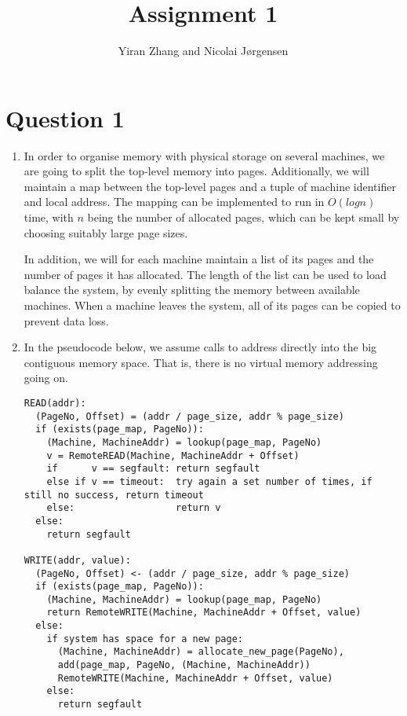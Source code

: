 \documentclass[11pt]{article}
\title          {Assignment 1}
\author         {Yiran Zhang and Nicolai Jørgensen}
\begin{document}
\maketitle
\newpage

\section{Question 1}

\begin{enumerate}

  \item
    In order to organise memory with physical storage on several machines, we are
    going to split the top-level memory into pages. Additionally, we will maintain a
    map between the top-level pages and a tuple of machine identifier and local
    address. The mapping can be implemented to run in $O(log n)$ time, with $n$ being the
    number of allocated pages, which can be kept small by choosing suitably large
    page sizes.

    In addition, we will for each machine maintain a list of its pages and the
    number of pages it has allocated. The length of the list can be used to load
    balance the system, by evenly splitting the memory between available machines.
    When a machine leaves the system, all of its pages can be copied to prevent data
    loss.

  \item
    In the pseudocode below, we assume calls to address directly into the big
    contiguous memory space. That is, there is no virtual memory addressing going
    on.
\begin{verbatim}
READ(addr):
  (PageNo, Offset) = (addr / page_size, addr % page_size)
  if (exists(page_map, PageNo)):
    (Machine, MachineAddr) = lookup(page_map, PageNo)
    v = RemoteREAD(Machine, MachineAddr + Offset)
    if      v == segfault: return segfault
    else if v == timeout:  try again a set number of times, if still no success, return timeout
    else:                  return v
  else:
    return segfault

WRITE(addr, value):
  (PageNo, Offset) <- (addr / page_size, addr % page_size)
  if (exists(page_map, PageNo)):
    (Machine, MachineAddr) = lookup(page_map, PageNo)
    return RemoteWRITE(Machine, MachineAddr + Offset, value)
  else:
    if system has space for a new page:
      (Machine, MachineAddr) = allocate_new_page(PageNo),
      add(page_map, PageNo, (Machine, MachineAddr))
      RemoteWRITE(Machine, MachineAddr + Offset, value)
    else:
      return segfault


\end{verbatim}
\end{enumerate}
\end{document}
